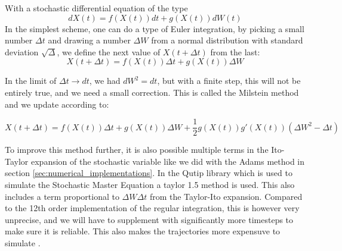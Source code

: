 With a stochastic differential equation of the type 
\begin{equation}\label{eq:stochastic_diff_equation_numerical}
    dX(t) = f(X(t))dt + g(X(t)) dW(t) 
\end{equation}
In the simplest scheme, one can do a type of Euler integration, by picking a small number $\Delta t$ and drawing a number $\Delta W$ from a normal distribution with standard deviation $\sqrt{\Delta}$, we define the next value of $X(t + \Delta t)$ from the last:
\begin{equation}
    X(t + \Delta t) = f(X(t))\Delta t + g(X(t)) \Delta W
\end{equation}

In the limit of $\Delta t \to dt$, we had $dW^2 = dt$, but with a finite step, this will not be entirely true, and we need a small correction. This is called the Milstein method \cite{giles} and we update according to:
\begin{fullwidth}
\raggedleft
\begin{equation}
    X(t + \Delta t) = f(X(t))\Delta t + g(X(t)) \Delta W + \frac12 g(X(t))g'(X(t))\left(\Delta W^2 - \Delta t \right)
\end{equation}
\end{fullwidth}
To improve this method further, it is also possible multiple terms in the Ito-Taylor expansion of the stochastic variable like we did with the Adams method in section \ref{sec:numerical_implementations}. In the Qutip library which is used to simulate the Stochastic Master Equation a taylor 1.5 method is used. This also includes a term proportional to $\Delta W \Delta t$ from the Taylor-Ito expansion. Compared to the 12th order implementation of the regular integration, this is however very unprecise, and we will have to supplement with significantly more timesteps to make sure it is reliable. This also makes the trajectories more expensuve to simulate \cite{johansson_qutip_2012}.



